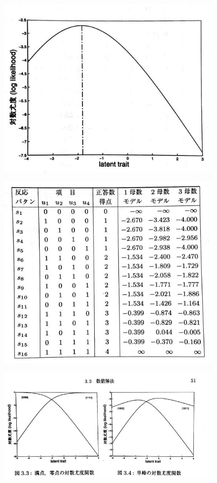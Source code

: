 \documentclass[12pt]{jarticle}
\begin{document}
\begin{figure}[H]
  \includegraphics[bb = -500 150 1 1,scale = 0.45]{2.jpg}
\end{figure}
\begin{figure}[H]
  \includegraphics[bb = 50 520 1 1,scale = 0.5]{3.jpg}
\end{figure}
\begin{figure}[H]
  \includegraphics[bb = -150 820 1 1,scale = 0.5]{4.jpg}
\end{figure}
\end{document}
